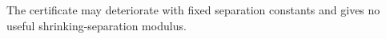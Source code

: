 The certificate may deteriorate with fixed separation constants and gives no useful shrinking-separation modulus.